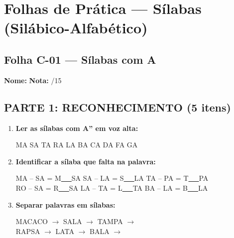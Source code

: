 
\section{Folhas de Prática --- Sílabas (Silábico-Alfabético)}


\subsection{Folha C-01 --- Sílabas com A}

\begin{exercicio}

\noindent\textbf{Nome:} \underline{\hspace{4cm}} \quad \textbf{Nota:} \underline{\hspace{1cm}}/15

\subsection*{PARTE 1: RECONHECIMENTO (5 itens)}

\begin{enumerate}
  \item \textbf{Ler as sílabas com A'' em voz alta:}
  \begin{center}
  MA \quad SA \quad TA \quad RA \quad LA \quad BA \quad CA \quad DA \quad FA \quad GA
  \end{center}

  \item \textbf{Identificar a sílaba que falta na palavra:}
  \begin{center}
  MA -- SA = M\underline{~~~}SA \quad SA -- LA = S\underline{~~~}LA \quad TA -- PA = T\underline{~~~}PA \\
  RO -- SA = R\underline{~~~}SA \quad LA -- TA = L\underline{~~~}TA \quad BA -- LA = B\underline{~~~}LA
  \end{center}

  \item \textbf{Separar palavras em sílabas:}
  \begin{center}
  MACACO $\rightarrow$ \underline{\hspace{1.5cm}} \quad SALA $\rightarrow$ \underline{\hspace{1.5cm}} \quad TAMPA $\rightarrow$ \underline{\hspace{1.5cm}} \\
  RAPSA $\rightarrow$ \underline{\hspace{1.5cm}} \quad LATA $\rightarrow$ \underline{\hspace{1.5cm}} \quad BALA $\rightarrow$ \underline{\hspace{1.5cm}}
  \end{center}


\end{enumerate}
\end{exercicio}
